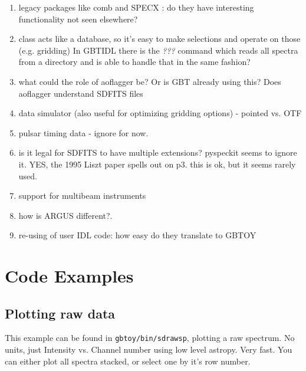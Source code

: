 \documentclass[12pt,a4paper]{article}
\begin{document}
\begin{enumerate}

\item legacy packages like comb and SPECX : do they have interesting functionality not seen elsewhere?

\item class acts like a database, so it's easy to make selections and operate on those (e.g. gridding)
  In GBTIDL there is the {\it ???} command which reads all spectra from a directory and is able
  to handle that in the same fashion?

\item   what could the role of aoflagger \cite{offringa-2012-morph-rfi-algorithm} be? Or is GBT already
  using this? Does aoflagger understand SDFITS files

\item  data simulator (also useful for optimizing gridding options) - pointed vs. OTF

\item pulsar timing data - ignore for now.

\item is it legal for SDFITS to have multiple extensions?  pyspeckit seems to ignore it.
  YES, the 1995 Liszt paper spells out on p3. this is ok, but it seems rarely used.

\item support for multibeam instruments

\item how is ARGUS different?.

\item re-using of user IDL code: how easy do they translate to GBTOY  
  
  
\end{enumerate}

\section{Code Examples}

\subsection{Plotting raw data}

This example can be found in {\tt gbtoy/bin/sdrawsp}, plotting a raw spectrum. No units, just
Intensity vs. Channel number using low level astropy. Very fast. You can either plot all spectra
stacked, or select one by it's row number.
\end{document}
